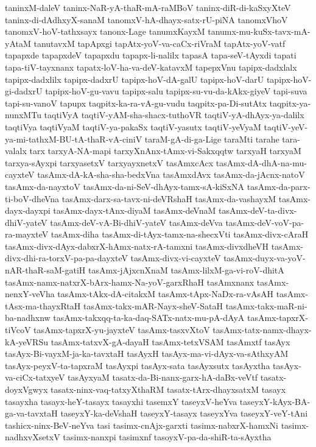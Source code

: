 {taninxM-daleV
taninx-NaR-yA-thaR-mA-raMBoV
taninx-diR-di-kaSxyXteV
taninx-di-dAdhxyX-sanaM
tanomxV-hA-dhayx-satx-rU-piNA
tanomxVhoV
tanomxV-hoV-tathxsayx
tanonx-Lage
tanumxKayxM
tanumx-mu-kuSx-tavx-mA-yAtaM
tanutavxM
tapApxgi
tapAtx-yoV-va-caCx-riVraM
tapAtx-yoV-vatf
tapapxde
tapapxdeV
tapapxdu
tapapx-li-nalilx
tapasA
tapa-seV-tAyxdi
tapati
tapa-tiV-tayxnanx
tapatx-loV-ha-va-deV-katavxM
tapepxVnu
tapipx-dadxlalx
tapipx-dadxlilx
tapipx-dadxrU
tapipx-hoV-dA-galU
tapipx-hoV-darU
tapipx-hoV-gi-dadxrU
tapipx-hoV-gu-vavu
tapipx-salu
tapipx-su-vu-da-kAkx-giyeV
tapi-suva
tapi-su-vanoV
tapupx
taqpitx-ka-ra-vA-gu-vudu
taqpitx-pa-Di-sutAtx
taqpitx-ya-nunxMTu
taqtiVyA
taqtiV-yAM-sha-shacx-tuthoVR
taqtiV-yA-dhAyx-ya-dalilx
taqtiVya
taqtiVyaM
taqtiV-ya-pakaSx
taqtiV-yasutx
taqtiV-yeVyaM
taqtiV-yeV-ya-mi-tathxM-BU-tA-thaR-vA-ciniV
taraM-gA-di-ga-Lige
taraMti
tarahe
tara-valalx
tarx
tarxyA-NA-mapi
tarxyXnAnx-tAmx-vi-Sakxqqtw
tarxyaH
tarxyaM
tarxya-sAyxpi
tarxyasetxV
tarxyayxnetxV
tasAmxcAcx
tasAmx-dA-dhA-na-mu-cayxteV
tasAmx-dA-kA-sha-sha-bedxVna
tasAmxdAvx
tasAmx-da-jAcnx-natoV
tasAmx-da-nayxtoV
tasAmx-da-ni-SeV-dhAyx-tamx-sA-kiSxNA
tasAmx-da-parx-ti-boV-dheVna
tasAmx-darx-sa-tavx-ni-deVRshaH
tasAmx-da-vashayxM
tasAmx-dayx-dayxpi
tasAmx-dayx-tAnx-diyaM
tasAmx-deVnaM
tasAmx-deV-ta-divx-dhiV-yateV
tasAmx-deV-vA-Bi-dhiV-yateV
tasAmx-deVva
tasAmx-deV-voV-pa-ra-mayxteV
tasAmx-diha
tasAmx-di-tAyx-tamx-na-shecxVti
tasAmx-divx-cAraH
tasAmx-divx-dAyx-dabxrX-hAmx-natx-rA-tamxni
tasAmx-divxdheVH
tasAmx-divx-dhi-ra-torxV-pa-pa-dayxteV
tasAmx-divx-vi-cayxteV
tasAmx-duyx-va-yoV-nAR-thaR-saM-gatiH
tasAmx-jAjxcnXnaM
tasAmx-lilxM-ga-vi-roV-dhitA
tasAmx-namx-natxrX-bArx-hamx-Na-yoV-garxRhaH
tasAmxnanx
tasAmx-nenxY-veVha
tasAmx-tAkx-dA-citakxM
tasAmx-tApx-NaDx-ra-vAsAH
tasAmx-tAsx-ma-thayxRtaH
tasAmx-takx-mAR-Nayx-sheV-SataH
tasAmx-takx-maR-ni-ba-nadhxnw
tasAmx-takxqq-ta-ka-daq-SATx-natx-mu-pA-dAyA
tasAmx-tapxrX-tiVcoV
tasAmx-tapxrX-yu-jayxteV
tasAmx-tasxvXtoV
tasAmx-tatx-namx-dhayx-kA-yeVRSu
tasAmx-tatxvX-gA-dayaH
tasAmx-tetxVSAM
tasAmxtf
tasAyx
tasAyx-Bi-vayxM-ja-ka-tavxtaH
tasAyxH
tasAyx-ma-vi-dAyx-va-sAthxyAM
tasAyx-peyxV-ta-tapxraM
tasAyxpi
tasAyx-sata
tasAyxsutx
tasAyxtha
tasAyx-va-ciCx-tatxyeV
tasAyxyaM
tasatx-da-Bi-nanx-garx-hA-daBx-veVtf
tasatx-doyxVgwyx
tasatx-ninx-vaq-tatxyXthaRM
tasatx-tArx-dhayxsatxM
tasayx
tasayxha
tasayx-heY-tasayx
tasayxhi
tasemxY
taseyxV-heYva
taseyxY-kAyx-BA-ga-va-tavxtaH
taseyxY-ka-deVshaH
taseyxY-tasayx
taseyxYva
taseyxY-veY-tAni
tashicx-ninx-BeV-neYva
tasi
tasimx-cnAjx-garxti
tasimx-nabxrX-hamxNi
tasimx-nadhxvXsetxV
tasimx-nanxpi
tasimxnf
tasoyxV-pa-da-shiR-ta-sAyxtha
}
